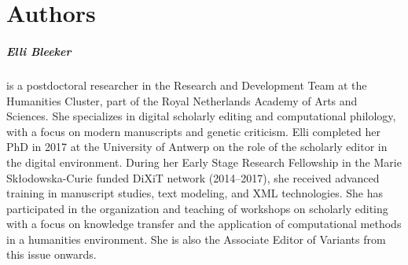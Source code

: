 \pagestyle{authors}
\chapter*{Authors}
\protect\thispagestyle{chaptertitlepage}



\paragraph{Elli Bleeker} is a postdoctoral researcher in the Research and Development Team at the Humanities Cluster, part of the Royal Netherlands Academy of Arts and Sciences. She specializes in digital scholarly editing and computational philology, with a focus on modern manuscripts and genetic criticism. Elli completed her PhD in 2017 at the University of Antwerp on the role of the scholarly editor in the digital environment. During her Early Stage Research Fellowship in the Marie Skłodowska-Curie funded DiXiT network (2014–2017), she received advanced training in manuscript studies, text modeling, and XML technologies. She has participated in the organization and teaching of workshops on scholarly editing with a focus on knowledge transfer and the application of computational methods in a humanities environment. She is also the Associate Editor of Variants from this issue onwards.

